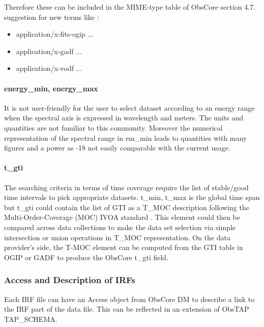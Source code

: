 \documentclass[11pt,a4paper]{ivoa}
\begin{document}
{Therefore these can be included in the MIME-type table of ObsCore section 4.7. suggestion for new terms like :
\begin{itemize}
\item application/x-fits-ogip ...
\item application/x-gadf  ...
\item application/x-vodf  ...
\end{itemize}


\paragraph{energy\_min, energy\_max}
It is not user-friendly for the user to select dataset according to an energy range when the spectral axis is expressed in wavelength and meters. The units and quantities are not familiar to this community.
Moreover the numerical representation of the spectral range in em\_min leads to quantities with many figures and a power as -18 not easily comparable with the current usage.



\paragraph{t\_gti}

The searching criteria in terms of time coverage require the list of stable/good time intervals to pick appropriate datasets.
t\_min, t\_max is the global time span but t\_gti could contain the list of \gls{GTI} as a T\_MOC description following the Multi-Order-Coverage (MOC) \gls{IVOA} standard \citep{2022ivoa.spec.0727F}.
This element could then be compared across data collections to make the data set selection via simple intersection or union operations in T\_MOC representation.
On the data provider's side, the T-MOC element can be computed from the \gls{GTI} table in \gls{OGIP} or \gls{GADF} to produce the ObsCore t\_gti field.




\subsubsection{Access and Description of IRFs}

Each \gls{IRF} file can have an Access object from ObsCore DM to describe a link to the \gls{IRF} part of the data file.
This can be reflected in an extension of ObsTAP TAP\_SCHEMA.

}
\end{document}
